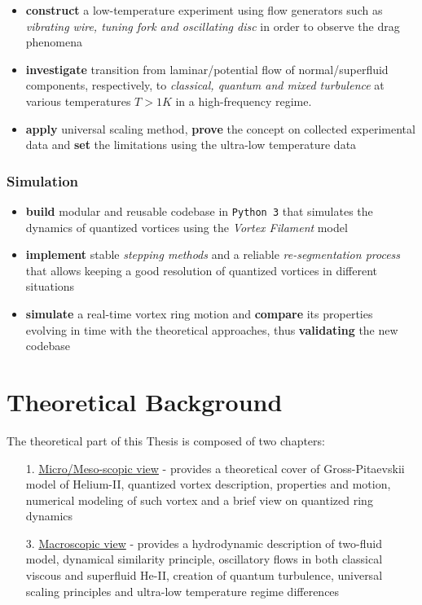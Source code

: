	\begin{itemize}
		\item \textbf{construct} a low-temperature experiment using flow generators such as \textit{vibrating wire, tuning fork and oscillating disc} in order to observe the drag phenomena
		\item \textbf{investigate} transition from laminar/potential flow of normal/superfluid components, respectively, to \textit{classical, quantum and mixed turbulence} at various temperatures $T > 1\unit{K}$ in a high-frequency regime.
		\item \textbf{apply} universal scaling method, \textbf{prove} the concept on collected experimental data and \textbf{set} the limitations using the ultra-low temperature data
	\end{itemize}

	\subsection*{Simulation}
	\begin{itemize}
		\item \textbf{build} modular and reusable codebase in \texttt{Python 3} that simulates the dynamics of quantized vortices using the \textit{Vortex Filament} model
		\item \textbf{implement} stable \textit{stepping methods} and a reliable \textit{re-segmentation process} that allows keeping a good resolution of quantized vortices in different situations
		\item \textbf{simulate} a real-time vortex ring motion and \textbf{compare} its properties evolving in time with the theoretical approaches, thus \textbf{validating} the new codebase
	\end{itemize}

\newpage


\chapter{Theoretical Background}

The theoretical part of this Thesis is composed of two chapters:

\begin{itemize}
	\item[1.] \underline{Micro/Meso-scopic view} - provides a theoretical cover of Gross-Pitaevskii model of Helium-II, quantized vortex description, properties and motion, numerical modeling of such vortex and a brief view on quantized ring dynamics

	\item[3.] \underline{Macroscopic view} - provides a hydrodynamic description of two-fluid model, dynamical similarity principle, oscillatory flows in both classical viscous and superfluid He-II, creation of quantum turbulence, universal scaling principles and ultra-low temperature regime differences

\end{itemize}

